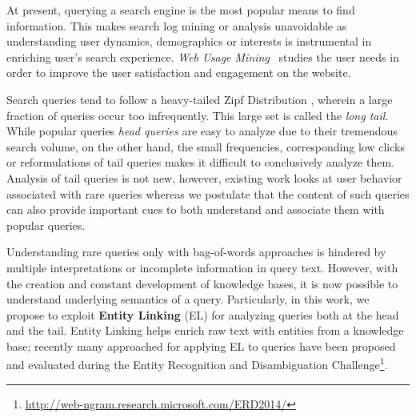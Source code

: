 At present, querying a search engine is the most popular means to find information. This makes
search log mining or analysis unavoidable as understanding user dynamics, demographics or interests
is instrumental in enriching user's search experience. \emph{Web Usage Mining}~\cite{silvestri2010mining}  
studies the user needs in order to improve the user satisfaction and engagement on the website. 

Search queries tend to follow a heavy-tailed Zipf Distribution \cite{baeza2007impact}, wherein a large 
fraction of queries occur too infrequently. This large set is called the \emph{long tail}. While 
popular queries \emph{head queries} are easy to analyze due to their tremendous search volume, on the 
other hand, the small frequencies, corresponding low clicks or reformulations 
of tail queries makes it difficult to conclusively analyze them. Analysis of tail queries is not new, 
however, existing work \cite{Doug2007Sigir,Goel2010Wsdm} looks at user behavior associated with
rare queries whereas we postulate that the content of such queries can also provide important cues to both
understand and associate them with popular queries. 

Understanding rare queries only with bag-of-words approaches is hindered by multiple interpretations or
incomplete information in query text. 
However, with the creation and constant development of knowledge bases, it is now possible to understand underlying semantics
of a query. Particularly, in this work, we propose to exploit \textbf{Entity Linking} (EL) for analyzing queries 
both at the head and the tail. Entity Linking helps enrich raw text with entities from a knowledge base; recently 
many approached for applying EL to queries have been proposed and evaluated during the Entity Recognition and Disambiguation Challenge\footnote{\url{http://web-ngram.research.microsoft.com/ERD2014/}}. 



